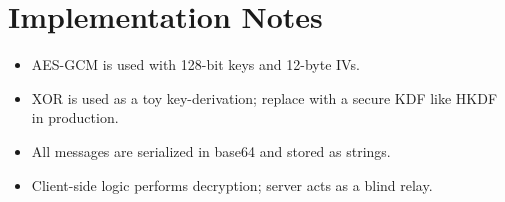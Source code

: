 \documentclass[12pt]{article}
\begin{document}
\section*{Implementation Notes}

\begin{itemize}
  \item AES-GCM is used with 128-bit keys and 12-byte IVs.
  \item XOR is used as a toy key-derivation; replace with a secure KDF like HKDF in production.
  \item All messages are serialized in base64 and stored as strings.
  \item Client-side logic performs decryption; server acts as a blind relay.
\end{itemize}
\end{document}
